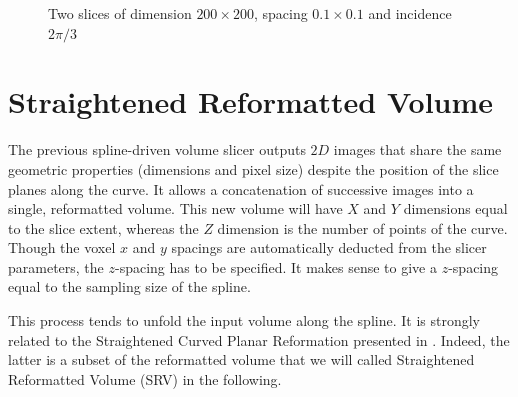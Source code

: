 \documentclass{InsightArticle}
\begin{document}
\begin{figure}
\centering
{}
\caption{Two slices of dimension $200\times200$, spacing $0.1\times0.1$ and
incidence $2\pi/3$}
\label{fig:mandibule_slices}
\end{figure}
%
\section{Straightened Reformatted Volume}
%
The previous spline-driven volume slicer outputs $2D$ images that share the same
geometric properties (dimensions and pixel size) despite the position of the
slice planes along the curve. It allows a concatenation of successive images
into a single, reformatted volume. This new volume will have $X$ and $Y$
dimensions equal to the slice extent, whereas the $Z$ dimension is the number of
points of the curve. Though the voxel $x$ and $y$ spacings are automatically
deducted from the slicer parameters, the $z$-spacing has to be specified. It
makes sense to give a $z$-spacing equal to the sampling size of the spline. 

This process tends to unfold the input volume along the spline. It is strongly
related to the Straightened Curved Planar Reformation presented in
\cite{KAN02.1}. Indeed, the latter is a subset of the reformatted volume that
we will called Straightened Reformatted Volume (SRV) in the following.
\end{document}
